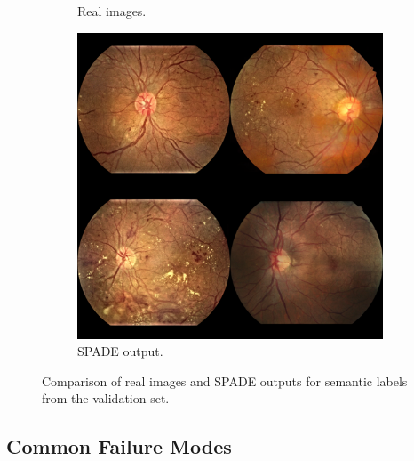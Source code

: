 \begin{figure}[h]
\begin{subfigure}{0.3\textwidth}
        \caption{Real images.}
        \label{fig:spade_image_sample}
    \end{subfigure}
    \begin{subfigure}{0.3\textwidth}
        \centering
        \includegraphics[width=\linewidth]{retinas/figs/spade_sample1.png}
        \caption{SPADE output.}
        \label{fig:spade_generated_sample}
    \end{subfigure}
    \caption{Comparison of real images and SPADE outputs for semantic labels from the validation set.}
    \label{fig:spade_sample}
\end{figure}

\subsection{Common Failure Modes}

